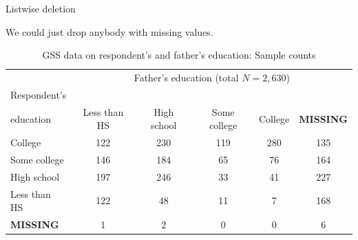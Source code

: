 \documentclass{beamer}
\newcommand\red[1]{{\color{red}#1}}
\newcommand\bred[1]{{\color{red}\textbf{#1}}}
\newcommand\blue[1]{{\color{blue}#1}}
\newcommand\bblue[1]{{\color{blue}\textbf{#1}}}
\begin{document}
\begin{frame}{Listwise deletion}

We could just \blue{drop anybody with missing values}. \pause

\begin{table}[ht]
\centering
\begingroup\scriptsize
\begin{tabular}{lccccc}
 & \multicolumn{5}{c}{Father's education (total $N = 2,630$)} \\
 \cmidrule(lr){2-6}
 Respondent's \\
 education & Less than HS & High school & Some college & College & \bred{MISSING} \\ 
 \cmidrule(lr){1-1} \cmidrule(lr){2-6}
College & 122 & 230 & 119 & 280 & \red{135} \\ 
  Some college & 146 & 184 &  65 &  76 & \red{164} \\ 
  High school & 197 & 246 &  33 &  41 & \red{227} \\ 
  Less than HS & 122 &  48 &  11 &   7 & \red{168} \\ 
   \hline
\bred{MISSING} &   \red{1} &   \red{2} &   \red{0} &   \red{0} &   \red{6} \\
  \end{tabular}
  \endgroup
  \caption{GSS data on respondent's and father's education: Sample counts}
\end{table}
\end{frame}

\end{document}
